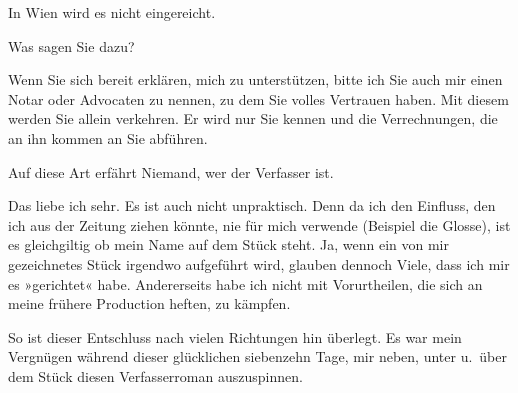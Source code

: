 \pstart
           In Wien wird es nicht eingereicht.\pend
           
\pstart
           Was sagen Sie dazu?\pend
           
\pstart
           Wenn Sie sich bereit erklären, mich zu unterstützen, bitte ich Sie auch mir einen
               Notar oder Advocaten zu nennen, zu dem Sie volles Vertrauen haben. Mit diesem werden
               Sie allein verkehren. Er wird nur Sie kennen und die Verrechnungen, die an ihn kommen
               an Sie abführen.\pend
           
\pstart
           Auf diese Art erfährt Niemand, wer der Verfasser ist.\pend
           
\pstart
           Das liebe ich sehr. Es ist auch nicht unpraktisch. Denn da ich den Einfluss, den ich
               aus der Zeitung ziehen könnte,
               nie für mich verwende \introOben{}(Beispiel die Glosse)\introOben{}, ist es gleichgiltig ob mein Name auf dem
                  Stück steht. Ja, wenn ein
               von mir gezeichnetes Stück irgendwo aufgeführt wird, glauben dennoch Viele, dass ich
               mir es »gerichtet« habe. Andererseits habe ich nicht mit Vorurtheilen, die sich {\pb}an meine frühere Production heften, zu
               kämpfen.\pend
           
\pstart
           So ist dieser Entschluss nach vielen Richtungen hin überlegt. Es war mein Vergnügen
               während dieser glücklichen siebenzehn Tage, mir neben, unter u. über dem Stück diesen Verfasserroman
               auszuspinnen.\pend
           
